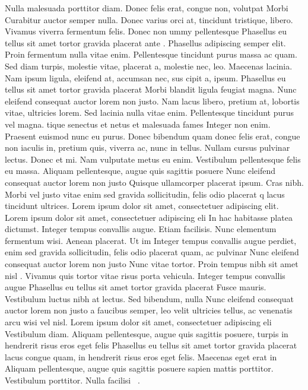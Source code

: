 \documentclass[11pt,a4paper]{article}
\begin{document}
Nulla malesuada porttitor diam. Donec felis erat, congue non, volutpat  Morbi Curabitur auctor semper nulla. Donec varius orci 
at, tincidunt tristique, libero. Vivamus viverra fermentum felis. Donec non ummy pellentesque  Phasellus eu tellus sit amet tortor gravida placerat
ante \cite{LHCB-PAPER-2017-013,Eur.Phys.J.C80(2020)7.641}. Phasellus adipiscing semper elit. Proin fermentum  nulla vitae enim. Pellentesque tincidunt purus
massa ac quam. Sed diam turpis, molestie vitae, placerat a, molestie nec,
leo. Maecenas lacinia. Nam ipsum ligula, eleifend at, accumsan nec, sus cipit a, ipsum.  Phasellus eu tellus sit amet tortor gravida placerat
Morbi blandit ligula feugiat magna. Nunc eleifend consequat auctor lorem non justo. Nam lacus libero, pretium at, lobortis vitae, ultricies
lorem. Sed lacinia nulla vitae enim. Pellentesque tincidunt purus vel magna. tique senectus et netus et malesuada fames 
Integer non enim. Praesent euismod nunc eu purus. Donec bibendum quam donec felis erat, congue non  iaculis in, pretium quis, viverra ac, nunc
in tellus\cite{Coleppa:2017rgb,ChavezFrias:666sob,ATLAS-CONF-2021-025}. Nullam cursus pulvinar lectus. Donec et mi. Nam vulputate metus
eu enim. Vestibulum pellentesque felis eu massa. Aliquam pellentesque, augue quis sagittis posuere  Nunc eleifend consequat auctor lorem non justo
Quisque ullamcorper placerat ipsum. Cras nibh. Morbi vel justo vitae  enim sed gravida sollicitudin, felis odio placerat q
lacus tincidunt ultrices. Lorem ipsum dolor sit amet, consectetuer adipiscing elit. \\

Lorem ipsum dolor sit amet, consectetuer adipiscing eli In hac habitasse platea dictumst. Integer tempus convallis augue. 
Etiam facilisis. Nunc elementum fermentum wisi. Aenean placerat. Ut im  Integer tempus convallis augue
perdiet, enim sed gravida sollicitudin, felis odio placerat quam, ac pulvinar Nunc eleifend consequat auctor lorem non justo
\cite{hep-ph/9501339, Ellis:2013yxa,1407.5089, Boudjema:2015nda,1507.07926,1603.03632,Gritsan:2016hjl, Li:2017dyz, AmorDosSantos:2017ayi, 1804.05874} 
Nunc vitae tortor. Proin tempus nibh sit amet nisl \cite{hep-ph/9605326,BhupalDev:2007ftb}. 
Vivamus quis tortor vitae risus porta vehicula.  Integer tempus convallis augue Phasellus eu tellus sit amet tortor gravida placerat
Fusce mauris. Vestibulum luctus nibh at lectus. Sed bibendum, nulla Nunc eleifend consequat auctor lorem non justo
a faucibus semper, leo \cite{FERMILAB-PUB-15-107-T} velit ultricies tellus, ac venenatis arcu wisi vel nisl. Lorem ipsum dolor sit amet, consectetuer adipiscing eli
Vestibulum diam. Aliquam pellentesque, augue quis sagittis posuere, turpis in hendrerit risus eros eget felis Phasellus eu tellus sit amet tortor gravida placerat
lacus congue quam, in hendrerit risus eros eget felis. Maecenas eget erat in  Aliquam pellentesque, augue quis sagittis posuere
sapien mattis porttitor. Vestibulum porttitor. Nulla facilisi ~\cite{Fajfer:2012si}.

{



}
\end{document}
